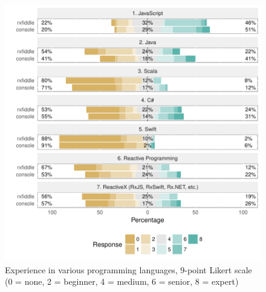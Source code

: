 \begin{figure}[t]
\includegraphics[width=\columnwidth]{images/experience.pdf}
\caption{Experience in various programming languages, 9-point Likert scale (0 = none, 2 = beginner, 4 = medium, 6 = senior, 8 = expert)}
\label{fig-experience}
\end{figure}
